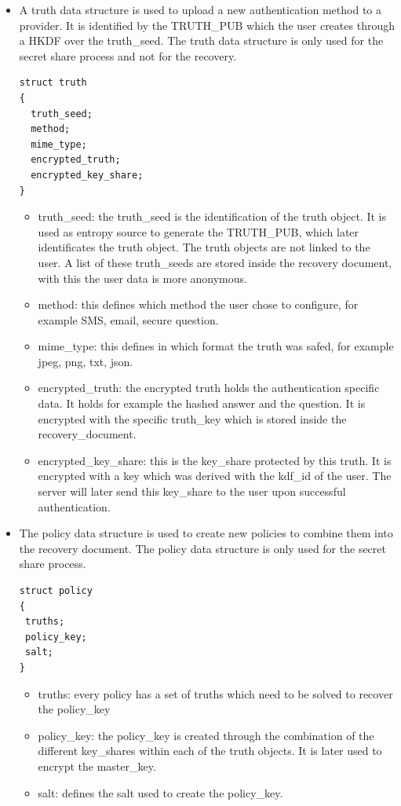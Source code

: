 \begin{itemize}
\item
A truth data structure is used to upload a new authentication method to a provider. It is identified by the TRUTH\_PUB which the user creates through a HKDF over the truth\_seed. The truth data structure is only used for the secret share process and not for the recovery.
\begin{lstlisting}
struct truth
{
  truth_seed;
  method;
  mime_type;
  encrypted_truth;
  encrypted_key_share;
}
\end{lstlisting}
\begin{itemize}
\item truth\_seed: the truth\_seed is the identification of the truth object.
It is used as entropy source to generate the TRUTH\_PUB, which later identificates the truth object. The truth objects are not linked to the user. A list of these truth\_seeds are stored inside the recovery document, with this the user data is more anonymous.
\item method: this defines which method the user chose to configure, for example SMS, email, secure question.
\item mime\_type: this defines in which format the truth was safed, for example jpeg, png, txt, json.
\item encrypted\_truth: the encrypted truth holds the authentication specific data. It holds for example the hashed answer and the question. It is encrypted with the specific truth\_key which is stored inside the recovery\_document.
\item encrypted\_key\_share: this is the key\_share protected by this truth. It is encrypted with a key which was derived with the kdf\_id of the user. The server will later send this key\_share to the user upon successful authentication.
\end{itemize}
\newpage
\item
The policy data structure is used to create new policies to combine them into the recovery document. The policy data structure is only used for the secret share process.
\begin{lstlisting}
struct policy
{
 truths;
 policy_key;
 salt;
}
\end{lstlisting}
\begin{itemize}
\item truths: every policy has a set of truths which need to be solved to recover the policy\_key
\item policy\_key: the policy\_key is created through the combination of the different key\_shares within each of the truth objects. It is later used to encrypt the master\_key.
\item salt: defines the salt used to create the policy\_key.
\end{itemize}


\end{itemize}
